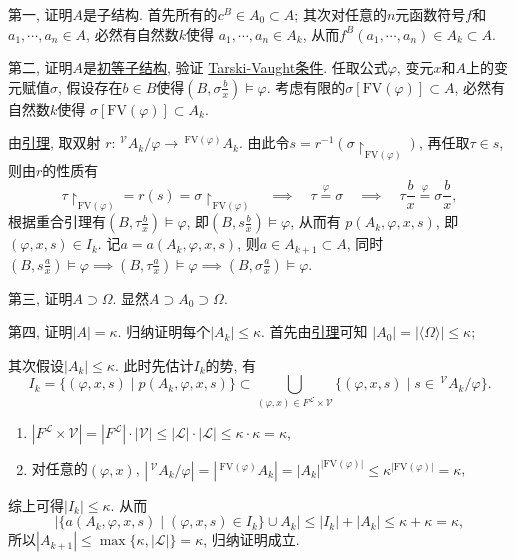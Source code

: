 \documentclass[UTF8]{ctexart}
\begin{document}
\vspace{3pt}
第一, 证明$A$是子结构. 首先所有的$c^B\in A_0\subset A$;
其次对任意的$n$元函数符号$f$和$a_1,\cdots,a_n\in A$, 必然有自然数$k$使得
$a_1,\cdots,a_n\in A_k$, 从而$f^B(a_1,\cdots,a_n)\in A_k\subset A$.

第二, 证明$A$是\href{01 初等嵌入#nameddest=sec:定义1.2}{初等子结构}, 验证
\href{01 初等嵌入#nameddest=sec:定理2.1}{Tarski-Vaught条件}. 任取公式$\varphi$,
变元$x$和$A$上的变元赋值$\sigma$, 假设存在$b\in B$使得$\displaystyle\left(
B,\sigma\frac{b}{x}\right)\models\varphi$.
考虑有限的$\sigma[\mathrm{FV}(\varphi)]\subset A$, 必然有自然数$k$使得
$\sigma[\mathrm{FV}(\varphi)]\subset A_k$.

\vspace{3pt}
由\href{../02 一阶语义/01 重合引理#nameddest=sec:定理2.1}{引理}, 取双射
$r:\,^{\mathcal{V}}\!A_k/\varphi\to\,^{\mathrm{FV}(\varphi)}A_k$.
由此令$s=r^{-1}(\sigma\!\restriction_{\mathrm{FV}(\varphi)})$, 再任取$\tau\in s$,
则由$r$的性质有
\[
    \tau\!\restriction_{\mathrm{FV}(\varphi)}=r(s)=\sigma\!\restriction_{\mathrm{FV}(\varphi)}
    \quad\implies\quad\tau\overset{\displaystyle\varphi}{=}\sigma\quad\implies\quad
    \tau\frac{b}{x}\overset{\displaystyle\varphi}{=}\sigma\frac{b}{x},
\]
根据重合引理有$\displaystyle\left(B,\tau\frac{b}{x}\right)\models\varphi$,
即$\displaystyle\left(B,s\frac{b}{x}\right)\models\varphi$, 从而有
$p(A_k,\varphi,x,s)$, 即$(\varphi,x,s)\in I_k$.
记$a=a(A_k,\varphi,x,s)$, 则$a\in A_{k+1}\subset A$, 同时
$\displaystyle\left(B,s\frac{a}{x}\right)\models\varphi\implies
\left(B,\tau\frac{a}{x}\right)\models\varphi\implies
\left(B,\sigma\frac{a}{x}\right)\models\varphi$.

\vspace{3pt}
第三, 证明$A\supset\Omega$. 显然$A\supset A_0\supset\Omega$.

第四, 证明$|A|=\kappa$. 归纳证明每个$|A_k|\leqslant\kappa$.
首先由\href{../01 一阶语言的结构/04 生成子结构#nameddest=sec:定理1.2}{引理}可知
$|A_0|=|\langle\Omega\rangle|\leqslant\kappa$;

其次假设$|A_k|\leqslant\kappa$. 此时先估计$I_k$的势, 有
\[
    I_k=\{(\varphi,x,s)\mid p(A_{k},\varphi,x,s)\}\subset
    \bigcup_{(\varphi,x)\in F^{\mathcal{L}}\times\mathcal{V}}\{(\varphi,x,s)\mid
    s\in\,\!^{\mathcal{V}}\!A_k/\varphi\}.
\]
\begin{enumerate}
    \item $|F^{\mathcal{L}}\times\mathcal{V}|=|F^{\mathcal{L}}|\cdot|\mathcal{V}|
    \leqslant|\mathcal{L}|\cdot|\mathcal{L}|\leqslant\kappa\cdot\kappa=\kappa$,
    \item 对任意的$(\varphi,x)$, $|\,^{\mathcal{V}}\!A_k/\varphi|=
    |\,^{\mathrm{FV}(\varphi)}A_k|=|A_k|^{|\mathrm{FV}(\varphi)|}
    \leqslant\kappa^{|\mathrm{FV}(\varphi)|}=\kappa$,
\end{enumerate}
综上可得$|I_k|\leqslant\kappa$. 从而
\[
    |\{a(A_k,\varphi,x,s)\mid(\varphi,x,s)\in I_k\}\cup A_k|\leqslant
    |I_k|+|A_k|\leqslant\kappa+\kappa=\kappa,
\]
所以$|A_{k+1}|\leqslant\max\{\kappa,|\mathcal{L}|\}=\kappa$, 归纳证明成立.
\end{document}
